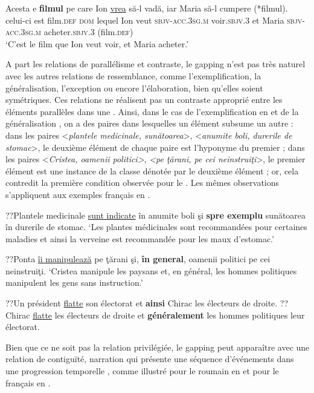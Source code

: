 \ex 
\gll Acesta  e  \textbf{filmul}  pe  care  Ion  \uline{vrea}  să-l  vadă,  iar Maria  să-l  cumpere  (*filmul).\\ 
celui-ci  est  film.\textsc{def}  \textsc{dom}  lequel  Ion  veut  \textsc{sbjv-acc.3sg.m}  voir.\textsc{sbjv.3}  et Maria  \textsc{sbjv-acc.3sg.m}  acheter.\textsc{sbjv.3}  (film.\textsc{def})\\
\glt ‘C’est le film que Ion veut voir, et Maria acheter.’   
\z
\z

A part les relations de parallélisme et contraste, le gapping n’est pas très naturel avec les autres relations de ressemblance, comme l’exemplification, la généralisation, l’exception ou encore l’élaboration, bien qu’elles soient symétriques. Ces relations ne réalisent pas un contraste approprié entre les éléments parallèles dans une  \citep{Kehler2000,Kehler2002}. Ainsi, dans le cas de l’exemplification en  et de la généralisation , on a des paires dans lesquelles un élément subsume un autre : dans les paires <\textit{plantele medicinale, sunătoarea}>, <\textit{anumite boli, durerile de stomac}>, le deuxième élément de chaque paire est l’hyponyme du premier ; dans les paires <\textit{Cristea, oamenii politici>}, \textit{<pe ţărani, pe cei neinstruiţi}>, le premier élément est une instance de la classe dénotée par le deuxième élément ; or, cela contredit la première condition observée pour le . Les mêmes observations s’appliquent aux exemples français en . 

\ea
\ea ??Plantele medicinale \uline{sunt indicate} în anumite boli şi\textbf{ spre exemplu} sunătoarea în durerile de stomac. \label{ch2:ex167a}
\glt ‘Les plantes médicinales sont recommandées pour certaines maladies et ainsi la verveine est recommandée pour les maux d’estomac.’  

\ex ??Ponta \uline{îi manipulează} pe ţărani şi, \textbf{în general}, oamenii politici pe cei neinstruiţi. \label{ch2:ex167b} 
\glt ‘Cristea manipule les paysans et, en général, les hommes politiques manipulent les gens sans instruction.’   
\z
\z

\ea \label{ch2:ex168}
\ea ??Un président \uline{flatte} son électorat et \textbf{ainsi} Chirac les électeurs de droite.  
\ex ??Chirac \uline{flatte} les électeurs de droite et \textbf{généralement} les hommes politiques leur électorat.            
\z
\z

Bien que ce ne soit pas la relation privilégiée, le gapping peut apparaître avec une relation de contiguïté, {\cad} narration qui présente une séquence d’événements dans une progression temporelle \citep{Hendriks2004}, comme illustré pour le roumain en  et pour le français en . 

